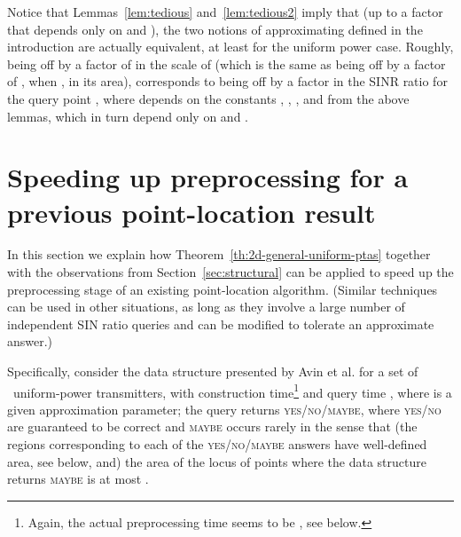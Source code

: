 \documentclass[11pt]{article}
\theoremstyle{remark}
\begin{document}
Notice that Lemmas~\ref{lem:tedious} and~\ref{lem:tedious2} imply that (up to a factor that depends only on  and ), the two notions of approximating  defined in the introduction are actually equivalent, at least for the uniform power case.
Roughly, being off by a factor of  in the scale of  (which is the same as being off by a factor of , when , in its area), corresponds to being off by a factor  in the SINR ratio  for the query point , where  depends on the constants , , , and  from the above lemmas, which in turn depend only on  and .


\section{Speeding up preprocessing for a previous point-location result}
\label{sec:speed-up}

In this section we explain how Theorem~\ref{th:2d-general-uniform-ptas} together with the observations from Section~\ref{sec:structural} can be applied to speed up the preprocessing stage of an existing point-location algorithm.  (Similar techniques can be used 
in other situations, as long as they involve a large number of independent SIN ratio queries and can be modified to tolerate an approximate answer.)



Specifically, consider the data structure presented by Avin et al. \cite{aeklpr-sdciawn-12} for a set of ~uniform-power transmitters, with construction time\footnote{Again, the actual preprocessing time seems to be , see below.}
 and query time , where  is a given approximation parameter; the query returns \textsc{yes/no/maybe}, where \textsc{yes/no} are guaranteed to be correct and \textsc{maybe} occurs rarely in the sense that (the regions corresponding to each of the \textsc{yes/no/maybe} answers have well-defined area, see below, and) the area of the locus of points where the data structure returns \textsc{maybe} is at most .
\end{document}
